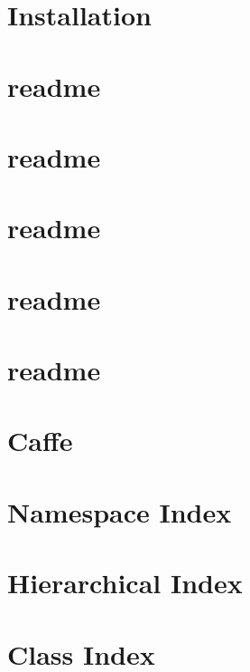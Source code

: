 \documentclass[twoside]{book}
\newcommand{\+}{\discretionary{\mbox{\scriptsize$\hookleftarrow$}}{}{}}
\begin{document}
\chapter{Installation}
\label{md__i_n_s_t_a_l_l}

\chapter{readme}
\label{md_models_bvlc_alexnet_readme}

\chapter{readme}
\label{md_models_bvlc_googlenet_readme}

\chapter{readme}
\label{md_models_bvlc_reference_caffenet_readme}

\chapter{readme}
\label{md_models_bvlc_reference_rcnn_ilsvrc13_readme}

\chapter{readme}
\label{md_models_finetune_flickr_style_readme}

\chapter{Caffe}
\label{md__r_e_a_d_m_e}

\chapter{Namespace Index}

\chapter{Hierarchical Index}

\chapter{Class Index}

\end{document}
